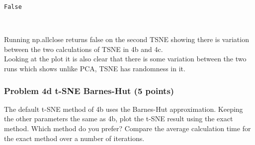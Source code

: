 \documentclass[11pt]{article}
\begin{document}
    \begin{Verbatim}[commandchars=\\\{\}]
False

    \end{Verbatim}

    \begin{center}
    \end{center}
    { \hspace*{\fill} \\}
    
    Running np.allclose returns false on the second TSNE showing there is
variation between the two calculations of TSNE in 4b and 4c.\\
Looking at the plot it is also clear that there is some variation
between the two runs which shows unlike PCA, TSNE has randomness in it.

    \subsubsection{Problem 4d t-SNE Barnes-Hut (5
points)}\label{problem-4d-t-sne-barnes-hut-5-points}

The default t-SNE method of 4b uses the Barnes-Hut approximation.
Keeping the other parameters the same as 4b, plot the t-SNE result using
the exact method. Which method do you prefer? Compare the average
calculation time for the exact method over a number of iterations.
\end{document}
